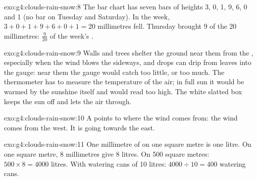 \begin{solution}{exo:g4:clouds-rain-snow:8}
The bar chart has seven bars of heights 3, 0, 1, 9, 6, 0 and 1 (no bar on
Tuesday and Saturday). In the week, $3 + 0 + 1 + 9 + 6 + 0 + 1 = 20$
millimetres fell. Thursday brought 9 of the 20 millimetres: $\frac{9}{20}$
of the week's .
\end{solution}

\begin{solution}{exo:g4:clouds-rain-snow:9}
Walls and trees shelter the ground near them from the , especially when
the wind blows the  sideways, and drops can drip from leaves into the
gauge: near them the gauge would catch too little, or too much. The
thermometer has to measure the temperature of the air; in full sun it would be
warmed by the sunshine itself and would read too high. The white slatted box
keeps the sun off and lets the air through.
\end{solution}

\begin{solution}{exo:g4:clouds-rain-snow:10}
A  points to where the wind comes from: the wind comes from the
west. It is going towards the east.
\end{solution}

\begin{solution}{exo:g4:clouds-rain-snow:11}
One millimetre of  on one square metre is one litre. On one square
metre, 8 millimetres give 8 litres. On 500 square metres:
$500 \times 8 = 4000$ litres. With watering cans of 10 litres:
$4000 \div 10 = 400$ watering cans.
\end{solution}
